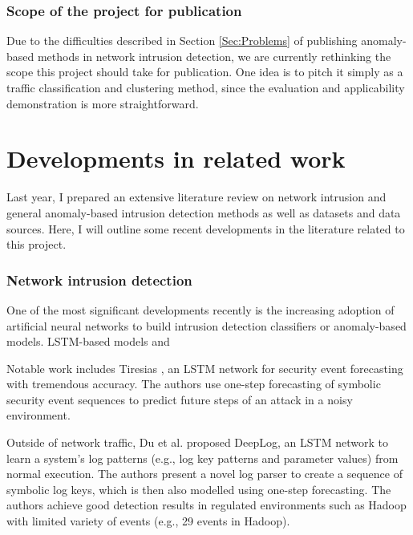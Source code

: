 \documentclass[a4paper,12pt,twoside]{article}
\begin{document}
\subsubsection{Scope of the project for publication}

Due to the difficulties described in Section \ref{Sec:Problems} of publishing anomaly-based methods in network intrusion detection, we are currently rethinking the scope this project should take for publication. One idea is to pitch it simply as a traffic classification and clustering method, since the evaluation and applicability demonstration is more straightforward.



\section{Developments in related work}

Last year, I prepared an extensive literature review on network intrusion and general anomaly-based intrusion detection methods as well as datasets and data sources. Here, I will outline some recent developments in the literature related to this project.

\subsubsection{Network intrusion detection}


One of the most significant developments recently is the increasing adoption of artificial neural networks to build intrusion detection classifiers or anomaly-based models. LSTM-based models and 

Notable work includes Tiresias \cite{shen2018tiresias}, an LSTM network for security event forecasting with tremendous accuracy. The authors use one-step forecasting of symbolic security event sequences to predict future steps of an attack in a noisy environment. 

Outside of network traffic, Du et al. \cite{du2017deeplog} proposed DeepLog, an LSTM network to learn a system's log patterns (e.g., log key patterns and parameter values) from normal execution. The authors present a novel log parser to create a sequence of symbolic log keys, which is then also modelled using one-step forecasting.
The authors achieve good detection results in regulated environments such as Hadoop with limited variety of events (e.g., 29 events in Hadoop).
\end{document}
